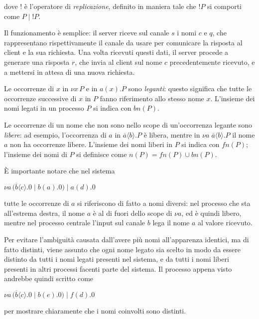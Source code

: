 dove $!$ \`e l'operatore di \emph{replicazione}, definito in maniera tale
che $!P$ si comporti come $P \; | \; !P$.

Il funzionamento \`e semplice: il server riceve sul canale $s$ i nomi $c$ e
$q$, che rappresentano rispettivamente il canale da usare per comunicare la
risposta al client e la sua richiesta. Una volta ricevuti questi dati, il
server procede a generare una risposta $r$, che invia al client sul nome $c$
precedentemente ricevuto, e a mettersi in attesa di una nuova richiesta.

Le occorrenze di $x$ in $\nu x \, P$ e in $ a(x).P$ sono \emph{leganti}:
questo significa che tutte le occorrenze successive di $x$ in $P$ fanno
riferimento allo stesso nome $x$. L'insieme dei nomi legati in un processo
$P$ si indica con $bn(P)$.

Le occorrenze di un nome che non sono nello scope di un'occorrenza legante
sono \emph{libere}: ad esempio, l'occorrenza di $a$ in
$\overline{a}\langle b\rangle.P$ \`e libera, mentre in
$\nu a \; \overline{a}\langle b\rangle.P$ il nome $a$ non ha occorrenze
libere. L'insieme dei nomi liberi in $P$ si indica con $fn(P)$; l'insieme
dei nomi di $P$ si definisce come $n(P) = fn(P) \cup bn(P)$.

\`E importante notare che nel sistema

\begin{pilisting}
$
    \nu a \, (
      \overline{b}\langle c\rangle.0 \; | \;
      b(a).0
    ) \; | \;
    a(d).0
$
\end{pilisting}

tutte le occorrenze di $a$ si riferiscono di fatto a nomi diversi: nel
processo che sta all'estrema destra, il nome $a$ \`e al di fuori dello
scope di $\nu a$, ed \`e quindi libero, mentre nel processo centrale
l'input sul canale $b$ lega il nome $a$ al valore ricevuto.

Per evitare l'ambiguit\`a causata dall'avere pi\`u nomi all'apparenza
identici, ma di fatto distinti, viene assunto che ogni nome legato sia
scelto in modo da essere distinto da tutti i nomi legati presenti nel
sistema, e da tutti i nomi liberi presenti in altri processi facenti parte
del sistema. Il processo appena visto andrebbe quindi scritto come

\begin{pilisting}
$
    \nu a \, (
      \overline{b}\langle c\rangle.0 \; | \;
      b(e).0
    ) \; | \;
    f(d).0
$
\end{pilisting}

per mostrare chiaramente che i nomi coinvolti sono distinti.
